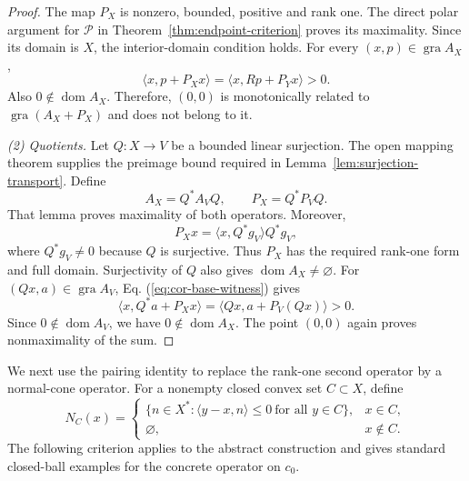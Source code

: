 \documentclass[11pt]{article}
\newcommand{\gra}{\operatorname{gra}}
\newcommand{\dom}{\operatorname{dom}}
\newcommand{\pair}[2]{\langle #1,#2\rangle}
\theoremstyle{definition}
\theoremstyle{remark}
\begin{document}
\begin{proof}
The map $P_X$ is nonzero, bounded, positive and rank one. The direct polar argument for $\mathcal P$ in Theorem~\ref{thm:endpoint-criterion} proves its maximality. Since its domain is $X$, the interior-domain condition holds. For every $(x,p)\in\gra A_X$,
\[
\pair{x}{p+P_Xx}
=\pair{x}{Rp+P_Yx}>0.
\]
Also $0\notin\dom A_X$. Therefore, $(0,0)$ is monotonically related to $\gra(A_X+P_X)$ and does not belong to it.

\noindent\textit{(2) Quotients.}
Let $Q:X\to V$ be a bounded linear surjection. The open mapping theorem supplies the preimage bound required in Lemma~\ref{lem:surjection-transport}. Define
\[
A_X=Q^*A_VQ,\qquad P_X=Q^*P_VQ.
\]
That lemma proves maximality of both operators. Moreover,
\[
P_Xx=\pair{x}{Q^*g_V}Q^*g_V,
\]
where $Q^*g_V\ne0$ because $Q$ is surjective. Thus $P_X$ has the required rank-one form and full domain. Surjectivity of $Q$ also gives $\dom A_X\ne\varnothing$. For $(Qx,a)\in\gra A_V$, Eq. (\ref{eq:cor-base-witness}) gives
\[
\pair{x}{Q^*a+P_Xx}
=\pair{Qx}{a+P_V(Qx)}>0.
\]
Since $0\notin\dom A_V$, we have $0\notin\dom A_X$. The point $(0,0)$ again proves nonmaximality of the sum.
\end{proof}

We next use the pairing identity to replace the rank-one second operator by a normal-cone operator. For a nonempty closed convex set $C\subset X$, define
\[
N_C(x)=
\begin{cases}
\{n\in X^*:\pair{y-x}{n}\le0\ \text{for all }y\in C\},&x\in C,\\
\varnothing,&x\notin C.
\end{cases}
\]
The following criterion applies to the abstract construction and gives standard closed-ball examples for the concrete operator on $c_0$.
\end{document}
